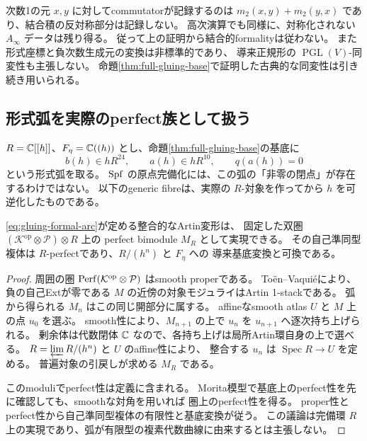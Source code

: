 \begin{remark}[この正規形が保存する情報]
次数1の元 $x,y$ に対してcommutatorが記録するのは
$m_2(x,y)+m_2(y,x)$ であり、結合積の反対称部分は記録しない。
高次演算でも同様に、対称化されない $A_\infty$ データは残り得る。
従って上の証明から結合的formalityは従わない。
また形式座標と負次数生成元の変換は非標準的であり、
導来正規形の $\operatorname{PGL}(V)$-同変性も主張しない。
命題\ref{thm:full-gluing-base}で証明した古典的な同変性は引き続き用いられる。
\end{remark}

\subsection{形式弧を実際のperfect族として扱う}

$R=\mathbb C[[h]]$、$F_\eta=\mathbb C((h))$ とし、命題\ref{thm:full-gluing-base}の基底に
\begin{equation}\label{eq:gluing-formal-arc}
 b(h)\in hR^{24},\qquad a(h)\in hR^{10},\qquad q(a(h))=0
\end{equation}
という形式弧を取る。
$\operatorname{Spf}$ の原点完備化には、この弧の「非零の閉点」が存在するわけではない。
以下のgeneric fibreは、実際の $R$-対象を作ってから $h$ を可逆化したものである。

\begin{lemma}[形式弧のeffectivity]\label{lem:gluing-arc-effective}
\eqref{eq:gluing-formal-arc}が定める整合的なArtin変形は、
固定した双圏 $(\mathcal K^{\mathrm{op}}\otimes\mathcal P)\otimes R$ 上の
perfect bimodule $M_R$ として実現できる。
その自己準同型複体は $R$-perfectであり、$R/(h^n)$ と $F_\eta$ への
導来基底変換と可換である。
\end{lemma}

\begin{proof}
周囲の圏 $\operatorname{Perf}(\mathcal K^{\mathrm{op}}\otimes\mathcal P)$ はsmooth properである。
Toën--Vaquié\cite[Theorem 3.6, Corollaries 3.15, 3.21--3.22]{TV}により、
負の自己Extが零である $M$ の近傍の対象モジュライはArtin 1-stackである。
弧から得られる $M_n$ はこの同じ開部分に属する。
affineなsmooth atlas $U$ と $M$ 上の点 $u_0$ を選ぶ。
smooth性により、$M_{n+1}$ の上で $u_n$ を $u_{n+1}$ へ逐次持ち上げられる。
剰余体は代数閉体 $\mathbb C$ なので、各持ち上げは局所Artin環自身の上で選べる。
$R=\varprojlim R/(h^n)$ と $U$ のaffine性により、
整合する $u_n$ は $\operatorname{Spec}R\to U$ を定める。
普遍対象の引戻しが求める $M_R$ である。

このmoduliでperfect性は定義に含まれる。
Morita模型で基底上のperfect性を先に確認しても、smoothな対角を用いれば
圏上のperfect性を得る\cite[Lemma 2.8]{TV}。
proper性とperfect性から自己準同型複体の有限性と基底変換が従う。
この議論は完備環 $R$ 上の実現であり、弧が有限型の複素代数曲線に由来するとは主張しない。
\end{proof}

